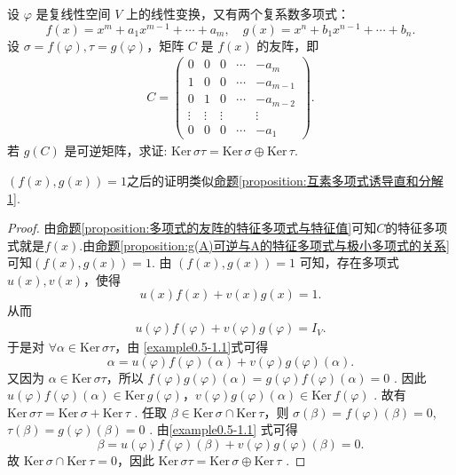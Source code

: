 \documentclass[../../main.tex]{subfiles}%
\begin{document}
\begin{example}
设 $\varphi$ 是复线性空间 $V$ 上的线性变换，又有两个复系数多项式：
\[f(x)=x^m + a_1x^{m - 1}+\cdots + a_m, \quad g(x)=x^n + b_1x^{n - 1}+\cdots + b_n.\]
设 $\sigma = f(\varphi),\tau = g(\varphi)$，矩阵 $C$ 是 $f(x)$ 的友阵，即
\begin{align*}
C = \begin{pmatrix}
0 & 0 & 0 & \cdots & -a_m \\
1 & 0 & 0 & \cdots & -a_{m - 1} \\
0 & 1 & 0 & \cdots & -a_{m - 2} \\
\vdots & \vdots & \vdots & & \vdots \\
0 & 0 & 0 & \cdots & -a_1
\end{pmatrix}.
\end{align*}
若 $g(C)$ 是可逆矩阵，求证: $\mathrm{Ker}\,\sigma \tau =\mathrm{Ker}\,\sigma \oplus \mathrm{Ker}\,\tau $. 
\end{example}
\begin{note}
$(f(x),g(x))=1$之后的证明类似\hyperref[proposition:互素多项式诱导直和分解1]{命题\ref{proposition:互素多项式诱导直和分解1}}.
\end{note}
\begin{proof}

由\hyperref[proposition:多项式的友阵的特征多项式与特征值]{命题\ref{proposition:多项式的友阵的特征多项式与特征值}}可知$C$的特征多项式就是$f(x)$.由\hyperref[proposition:g(A)可逆与A的特征多项式与极小多项式的关系]{命题\ref{proposition:g(A)可逆与A的特征多项式与极小多项式的关系}}可知$(f(x),g(x))=1$.
由 $(f(x),g(x)) = 1$ 可知，存在多项式 $u(x),v(x)$，使得
\[u(x)f(x)+v(x)g(x)=1.\]
从而
\begin{align}
u(\varphi)f(\varphi)+v(\varphi)g(\varphi)=I_V. \label{example0.5-1.1}
\end{align}
于是对 $\forall \alpha\in\mathrm{Ker}\,\sigma\tau$，由 
\eqref{example0.5-1.1}式可得
\[\alpha = u(\varphi)f(\varphi)(\alpha)+v(\varphi)g(\varphi)(\alpha).\]
又因为 $\alpha\in\mathrm{Ker}\,\sigma\tau$，所以 $f(\varphi)g(\varphi)(\alpha)=g(\varphi)f(\varphi)(\alpha)=0$ . 因此 $u(\varphi)f(\varphi)(\alpha)\in\mathrm{Ker}\,g(\varphi)$，$v(\varphi)g(\varphi)(\alpha)\in\mathrm{Ker}\,f(\varphi)$ .
故有 $\mathrm{Ker}\,\sigma\tau=\mathrm{Ker}\,\sigma+\mathrm{Ker}\,\tau$ . 任取 $\beta\in\mathrm{Ker}\,\sigma\cap\mathrm{Ker}\,\tau$，则 $\sigma(\beta)=f(\varphi)(\beta)=0$,$\tau(\beta)=g(\varphi)(\beta)=0$ . 由\eqref{example0.5-1.1} 式可得
\[\beta = u(\varphi)f(\varphi)(\beta)+v(\varphi)g(\varphi)(\beta)=0.\]
故 $\mathrm{Ker}\,\sigma\cap\mathrm{Ker}\,\tau = 0$，因此 $\mathrm{Ker}\,\sigma\tau=\mathrm{Ker}\,\sigma\oplus\mathrm{Ker}\,\tau$ . 

\end{proof}
\end{document}
